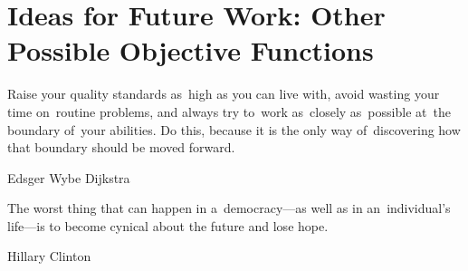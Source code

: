 \chapter{Ideas for Future Work: Other Possible Objective Functions}
\epigraph{
  Raise your quality standards as~high as you can live with, avoid wasting your time on~routine problems, and always try to~work as~closely as~possible at~the boundary of~your abilities.
  Do this, because it is the only way of~discovering how that boundary should be moved forward.
}{Edsger Wybe Dijkstra}
\epigraph{
  The worst thing that can happen in a~democracy---as well as in an~individual's life---is to become cynical about the future and lose hope.
}{Hillary Clinton}
